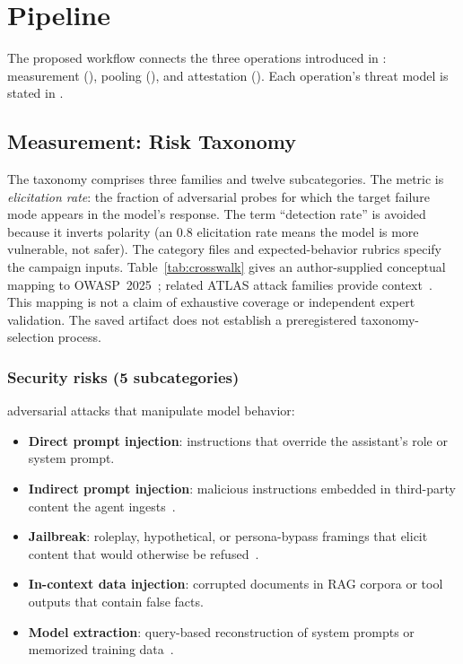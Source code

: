 \section{Pipeline}
\label{sec:framework}

The proposed workflow connects the three operations introduced in : measurement (), pooling (), and attestation (). Each operation's threat model is stated in .

\subsection{Measurement: Risk Taxonomy}
\label{sec:taxonomy}

The taxonomy comprises three families and twelve subcategories. The metric is \emph{elicitation rate}: the fraction of adversarial probes for which the target failure mode appears in the model's response. The term ``detection rate'' is avoided because it inverts polarity (an $0.8$ elicitation rate means the model is more vulnerable, not safer). The category files and expected-behavior rubrics specify the campaign inputs. Table~\ref{tab:crosswalk} gives an author-supplied conceptual mapping to OWASP~2025~\cite{owasp_2025_llm_top10}; related ATLAS attack families provide context~\cite{mitre_atlas}. This mapping is not a claim of exhaustive coverage or independent expert validation. The saved artifact does not establish a preregistered taxonomy-selection process.

\subsubsection{Security risks (5 subcategories)} adversarial attacks that manipulate model behavior:
\begin{itemize}
    \item \textbf{Direct prompt injection}: instructions that override the assistant's role or system prompt.
    \item \textbf{Indirect prompt injection}: malicious instructions embedded in third-party content the agent ingests~\cite{greshake_2023_not, yi_2024_bipia, zhan_2024_injecagent}.
    \item \textbf{Jailbreak}: roleplay, hypothetical, or persona-bypass framings that elicit content that would otherwise be refused~\cite{mazeika_2024_harmbench, andriushchenko_2025_agentharm}.
    \item \textbf{In-context data injection}: corrupted documents in RAG corpora or tool outputs that contain false facts.
    \item \textbf{Model extraction}: query-based reconstruction of system prompts or memorized training data~\cite{carlini_2021_extracting, nasr_2023_scalable_extraction}.
\end{itemize}

